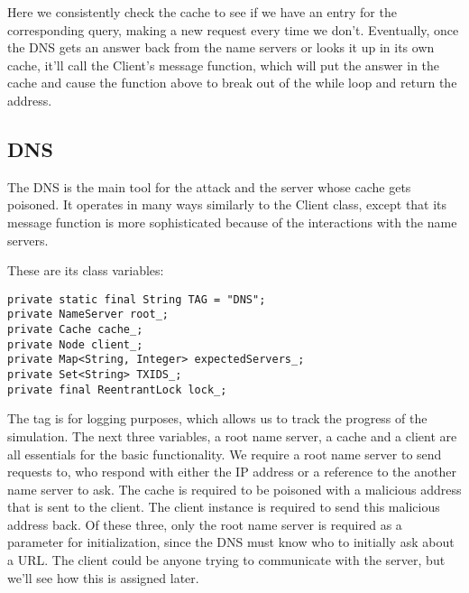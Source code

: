 \documentclass[a4paper, 12pt]{article} %
\begin{document}
Here we consistently check the cache to see if we have an entry for the corresponding query, making a new request every time we don't. Eventually, once the DNS gets an answer back from the name servers or looks it up in its own cache, it'll call the Client's message function, which will put the answer in the cache and cause the function above to break out of the while loop and return the address. 

\subsection*{DNS}

The DNS is the main tool for the attack and the server whose cache gets poisoned. It operates in many ways similarly to the Client class, except that its message function is more sophisticated because of the interactions with the name servers.

These are its class variables:

\begin{lstlisting}
private static final String TAG = "DNS";	
private NameServer root_;
private Cache cache_;
private Node client_;
private Map<String, Integer> expectedServers_;
private Set<String> TXIDS_;
private final ReentrantLock lock_;
\end{lstlisting}

The tag is for logging purposes, which allows us to track the progress of the simulation. The next three variables, a root name server, a cache and a client are all essentials for the basic functionality. We require a root name server to send requests to, who respond with either the IP address or a reference to the another name server to ask. The cache is required to be poisoned with a malicious address that is sent to the client. The client instance is required to send this malicious address back. Of these three, only the root name server is required as a parameter for initialization, since the DNS must know who to initially ask about a URL. The client could be anyone trying to communicate with the server, but we'll see how this is assigned later. 
\end{document}
